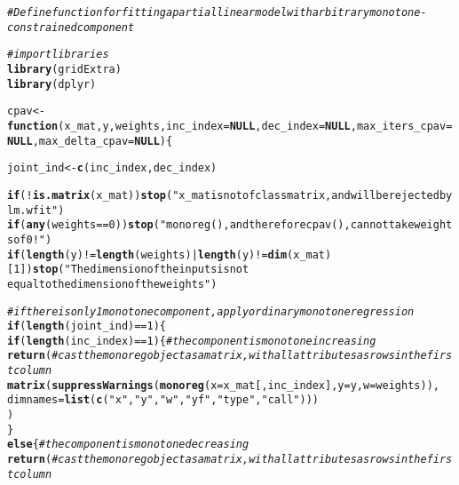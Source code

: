 \documentclass[fleqn,10pt]{olplainarticle}\usepackage[]{graphicx}\usepackage[]{color}
\makeatletter
\newcommand{\hlnum}[1]{\textcolor[rgb]{0.686,0.059,0.569}{#1}}%
\newcommand{\hlstr}[1]{\textcolor[rgb]{0.192,0.494,0.8}{#1}}%
\newcommand{\hlcom}[1]{\textcolor[rgb]{0.678,0.584,0.686}{\textit{#1}}}%
\newcommand{\hlopt}[1]{\textcolor[rgb]{0,0,0}{#1}}%
\newcommand{\hlstd}[1]{\textcolor[rgb]{0.345,0.345,0.345}{#1}}%
\newcommand{\hlkwa}[1]{\textcolor[rgb]{0.161,0.373,0.58}{\textbf{#1}}}%
\newcommand{\hlkwb}[1]{\textcolor[rgb]{0.69,0.353,0.396}{#1}}%
\newcommand{\hlkwc}[1]{\textcolor[rgb]{0.333,0.667,0.333}{#1}}%
\newcommand{\hlkwd}[1]{\textcolor[rgb]{0.737,0.353,0.396}{\textbf{#1}}}%
\newenvironment{kframe}{%
 \def\at@end@of@kframe{}%
 \ifinner\ifhmode%
  \def\at@end@of@kframe{\end{minipage}}%
  \begin{minipage}{\columnwidth}%
 \fi\fi%
 \def\FrameCommand##1{\hskip\@totalleftmargin \hskip-\fboxsep
 \colorbox{shadecolor}{##1}\hskip-\fboxsep
     \hskip-\linewidth \hskip-\@totalleftmargin \hskip\columnwidth}%
 \MakeFramed {\advance\hsize-\width
   \@totalleftmargin\z@ \linewidth\hsize
   \@setminipage}}%
 {\par\unskip\endMakeFramed%
 \at@end@of@kframe}
\newenvironment{knitrout}{}{} %
\makeatother
\begin{document}
\begin{appendices}
\begin{knitrout}
\color{fgcolor}\begin{kframe}
\begin{alltt}
\hlcom{# Define function for fitting a partial linear model with arbitrary monotone-constrained component}

\hlcom{# import libraries}
\hlkwd{library}\hlstd{(gridExtra)}
\hlkwd{library}\hlstd{(dplyr)}


\hlstd{cpav} \hlkwb{<-} \hlkwa{function}\hlstd{(}\hlkwc{x_mat}\hlstd{,} \hlkwc{y}\hlstd{,} \hlkwc{weights}\hlstd{,} \hlkwc{inc_index}\hlstd{=}\hlkwa{NULL}\hlstd{,} \hlkwc{dec_index}\hlstd{=}\hlkwa{NULL}\hlstd{,} \hlkwc{max_iters_cpav}\hlstd{=}\hlkwa{NULL}\hlstd{,} \hlkwc{max_delta_cpav}\hlstd{=}\hlkwa{NULL}\hlstd{)\{}

  \hlstd{joint_ind} \hlkwb{<-} \hlkwd{c}\hlstd{(inc_index, dec_index)}

  \hlkwa{if}\hlstd{(}\hlopt{!}\hlkwd{is.matrix}\hlstd{(x_mat))} \hlkwd{stop}\hlstd{(}\hlstr{"x_mat is not of class matrix, and will be rejected by lm.wfit"}\hlstd{)}
  \hlkwa{if}\hlstd{(}\hlkwd{any}\hlstd{(weights} \hlopt{==} \hlnum{0}\hlstd{))} \hlkwd{stop}\hlstd{(}\hlstr{"monoreg(), and therefore cpav(), cannot take weights of 0!"}\hlstd{)}
  \hlkwa{if}\hlstd{(}\hlkwd{length}\hlstd{(y)} \hlopt{!=} \hlkwd{length}\hlstd{(weights)} \hlopt{|} \hlkwd{length}\hlstd{(y)} \hlopt{!=} \hlkwd{dim}\hlstd{(x_mat)[}\hlnum{1}\hlstd{])} \hlkwd{stop}\hlstd{(}\hlstr{"The dimension of the inputs is not 
                                        equal to the dimension of the weights"}\hlstd{)}

  \hlcom{# if there is only 1 monotone component, apply ordinary monotone regression}
  \hlkwa{if}\hlstd{(}\hlkwd{length}\hlstd{(joint_ind)} \hlopt{==} \hlnum{1}\hlstd{)\{}
    \hlkwa{if}\hlstd{(}\hlkwd{length}\hlstd{(inc_index)} \hlopt{==} \hlnum{1}\hlstd{)\{} \hlcom{# the component is monotone increasing}
      \hlkwd{return}\hlstd{(} \hlcom{# cast the monoreg object as a matrix, with all attributes as rows in the first column}
        \hlkwd{matrix}\hlstd{(}\hlkwd{suppressWarnings}\hlstd{(}\hlkwd{monoreg}\hlstd{(}\hlkwc{x} \hlstd{= x_mat[,inc_index],} \hlkwc{y} \hlstd{= y,} \hlkwc{w} \hlstd{= weights)),}
               \hlkwc{dimnames} \hlstd{=} \hlkwd{list}\hlstd{(}\hlkwd{c}\hlstd{(}\hlstr{"x"}\hlstd{,} \hlstr{"y"}\hlstd{,} \hlstr{"w"}\hlstd{,} \hlstr{"yf"}\hlstd{,} \hlstr{"type"}\hlstd{,} \hlstr{"call"}\hlstd{)))}
      \hlstd{)}
    \hlstd{\}}
    \hlkwa{else}\hlstd{\{} \hlcom{# the component is monotone decreasing}
      \hlkwd{return}\hlstd{(} \hlcom{# cast the monoreg object as a matrix, with all attributes as rows in the first column}


\end{alltt}
\end{kframe}
\end{knitrout}
\end{appendices}
\end{document}
